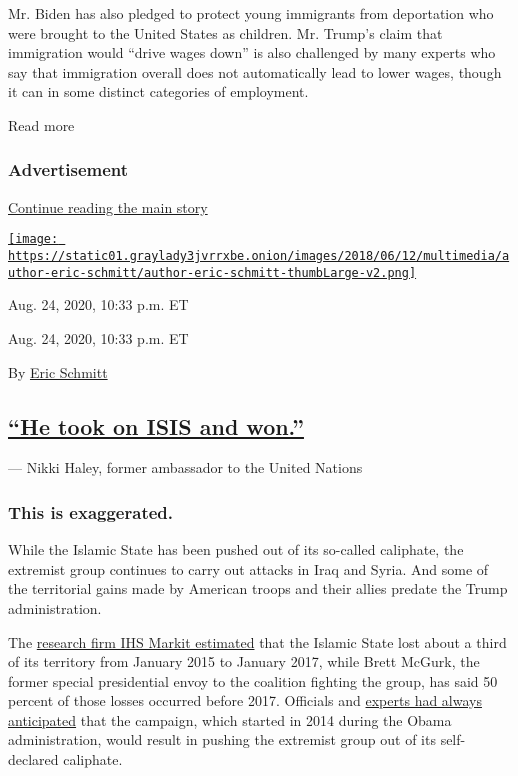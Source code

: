 Mr. Biden has also pledged to protect young immigrants from deportation
who were brought to the United States as children. Mr. Trump's claim
that immigration would ``drive wages down'' is also challenged by many
experts who say that immigration overall does not automatically lead to
lower wages, though it can in some distinct categories of employment.

Read more

\hypertarget{advertisement-3}{%
\subsubsection{Advertisement}\label{advertisement-3}}

\protect\hyperlink{after-dfp-ad-mid4}{Continue reading the main story}

\href{https://www.nytimes3xbfgragh.onion/by/eric-schmitt}{\texttt{[image: https://static01.graylady3jvrrxbe.onion/images/2018/06/12/multimedia/author-eric-schmitt/author-eric-schmitt-thumbLarge-v2.png]}}

Aug. 24, 2020, 10:33 p.m. ET

Aug. 24, 2020, 10:33 p.m. ET

By \href{https://www.nytimes3xbfgragh.onion/by/eric-schmitt}{Eric
Schmitt}

\hypertarget{he-took-on-isis-and-won}{%
\subsection{\texorpdfstring{\protect\hyperlink{he-took-on-isis-and-won}{``He
took on ISIS and
won.''}}{``He took on ISIS and won.''}}\label{he-took-on-isis-and-won}}

--- Nikki Haley, former ambassador to the United Nations

\hypertarget{this-is-exaggerated--2}{%
\subsubsection{This is exaggerated. }\label{this-is-exaggerated--2}}

While the Islamic State has been pushed out of its so-called caliphate,
the extremist group continues to carry out attacks in Iraq and Syria.
And some of the territorial gains made by American troops and their
allies predate the Trump administration.

The
\href{https://news.ihsmarkit.com/prviewer/release_only/slug/aerospace-defense-security-islamic-state-territory-down-60-percent-and-revenue-down-80}{research
firm IHS Markit estimated} that the Islamic State lost about a third of
its territory from January 2015 to January 2017, while Brett McGurk, the
former special presidential envoy to the coalition fighting the group,
has said 50 percent of those losses occurred before 2017. Officials and
\href{https://www.nytimes3xbfgragh.onion/2017/10/17/us/politics/trump-islamic-state-raqqa-fact-check.html}{experts
had always anticipated} that the campaign, which started in 2014 during
the Obama administration, would result in pushing the extremist group
out of its self-declared caliphate.

